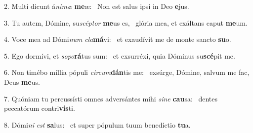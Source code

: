 2. Multi dicunt á\textit{ni}\textit{mæ} \textbf{me}æ: \ast\  Non est salus ipsi in Deo \textbf{e}jus.\

3. Tu autem, Dómine, su\textit{scép}\textit{tor} \textbf{me}us es, \ast\  glória mea, et exáltans caput \textbf{me}um.\

4. Voce mea ad Dómi\textit{num} \textit{cla}\textbf{má}vi: \ast\  et exaudívit me de monte sancto \textbf{su}o.\

5. Ego dormívi, et \textit{so}\textit{po}\textbf{rá}tus sum: \ast\  et exsurréxi, quia Dóminus su\textbf{scé}pit me.\

6. Non timébo míllia pópuli \textit{cir}\textit{cum}\textbf{dán}tis me: \ast\  exsúrge, Dómine, salvum me fac, Deus \textbf{me}us.\

7. Quóniam tu percussísti omnes adversántes mihi \textit{si}\textit{ne} \textbf{cau}sa: \ast\  dentes peccatórum contri\textbf{vís}ti.\

8. Dómi\textit{ni} \textit{est} \textbf{sa}lus: \ast\  et super pópulum tuum benedíctio \textbf{tu}a.\

